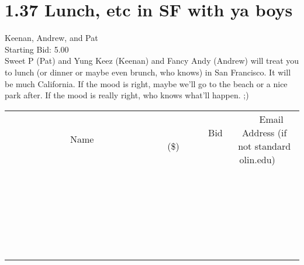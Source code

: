 \documentclass[11pt]{article}
\begin{document}
					\section*{1.37 Lunch, etc in SF with ya boys}
					Keenan, Andrew, and Pat \\
					Starting Bid: 5.00 \\
					Sweet P (Pat) and Yung Keez (Keenan) and Fancy Andy (Andrew) will treat you to lunch (or dinner or maybe even brunch, who knows) in San Francisco. It will be much California. If the mood is right, maybe we'll go to the beach or a nice park after. If the mood is really right, who knows what'll happen. ;) \\
					[6ex]
					\begin{tabular}{c c c}
						~~~~~~~~~~~~~Name~~~~~~~~~~~~~ & ~~~~~~~~~Bid (\$)~~~~~~~~~ & ~~~Email Address (if not standard olin.edu)~~~ \\
				
 & & \\
\hline
 & & \\
\hline
 & & \\
\hline
 & & \\
\hline
 & & \\
\hline
 & & \\
\hline
 & & \\
\hline
 & & \\
\hline
 & & \\
\hline
 & & \\
\hline
 & & \\
\hline
 & & \\
\hline
 & & \\
\hline
 & & \\
\hline
 & & \\
\hline
 & & \\
\hline
 & & \\
\hline
 & & \\
\hline
 & & \\
\hline
 & & \\
\hline
 & & \\
\hline
 & & \\
\hline
 & & \\
\hline
 & & \\
\hline
 & & \\
\hline
 & & \\
\hline
					\end{tabular}
					\clearpage
				
\end{document}
